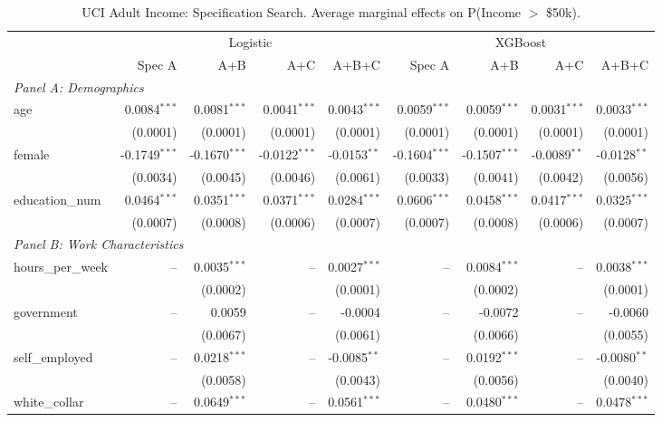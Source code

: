 \begin{table}[htbp]
\centering
\small
\begin{threeparttable}
\caption{UCI Adult Income: Specification Search. Average marginal effects on P(Income $>$ \$50k).}
\label{tab:adult_spec_search}
\begin{tabular}{lrrrrrrrr}
\toprule
 & \multicolumn{4}{c}{Logistic} & \multicolumn{4}{c}{XGBoost} \\
\cmidrule(lr){2-5} \cmidrule(lr){6-9} 
 & Spec A & A+B & A+C & A+B+C & Spec A & A+B & A+C & A+B+C \\
\midrule
\multicolumn{9}{l}{\textit{Panel A: Demographics}} \\
\quad age & 0.0084$^{***}$ & 0.0081$^{***}$ & 0.0041$^{***}$ & 0.0043$^{***}$ & 0.0059$^{***}$ & 0.0059$^{***}$ & 0.0031$^{***}$ & 0.0033$^{***}$ \\
 & (0.0001) & (0.0001) & (0.0001) & (0.0001) & (0.0001) & (0.0001) & (0.0001) & (0.0001) \\
\quad female & -0.1749$^{***}$ & -0.1670$^{***}$ & -0.0122$^{***}$ & -0.0153$^{**}$ & -0.1604$^{***}$ & -0.1507$^{***}$ & -0.0089$^{**}$ & -0.0128$^{**}$ \\
 & (0.0034) & (0.0045) & (0.0046) & (0.0061) & (0.0033) & (0.0041) & (0.0042) & (0.0056) \\
\quad education\_num & 0.0464$^{***}$ & 0.0351$^{***}$ & 0.0371$^{***}$ & 0.0284$^{***}$ & 0.0606$^{***}$ & 0.0458$^{***}$ & 0.0417$^{***}$ & 0.0325$^{***}$ \\
 & (0.0007) & (0.0008) & (0.0006) & (0.0007) & (0.0007) & (0.0008) & (0.0006) & (0.0007) \\
\midrule
\multicolumn{9}{l}{\textit{Panel B: Work Characteristics}} \\
\quad hours\_per\_week & -- & 0.0035$^{***}$ & -- & 0.0027$^{***}$ & -- & 0.0084$^{***}$ & -- & 0.0038$^{***}$ \\
 &  & (0.0002) &  & (0.0001) &  & (0.0002) &  & (0.0001) \\
\quad government & -- & 0.0059 & -- & -0.0004 & -- & -0.0072 & -- & -0.0060 \\
 &  & (0.0067) &  & (0.0061) &  & (0.0066) &  & (0.0055) \\
\quad self\_employed & -- & 0.0218$^{***}$ & -- & -0.0085$^{**}$ & -- & 0.0192$^{***}$ & -- & -0.0080$^{**}$ \\
 &  & (0.0058) &  & (0.0043) &  & (0.0056) &  & (0.0040) \\
\quad white\_collar & -- & 0.0649$^{***}$ & -- & 0.0561$^{***}$ & -- & 0.0480$^{***}$ & -- & 0.0478$^{***}$ \\

\end{tabular}
\end{threeparttable}
\end{table}
